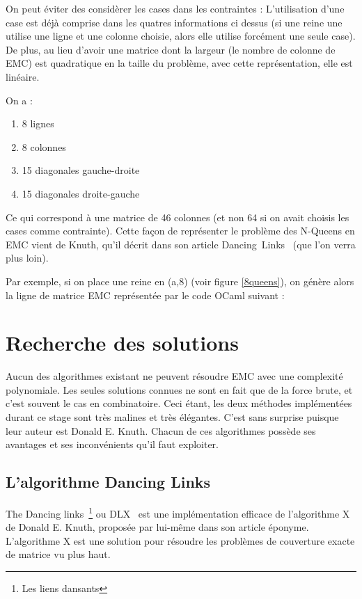 \documentclass[a4paper]{article}
\begin{document}
On peut éviter des considèrer les cases dans les contraintes : L'utilisation
d'une case est déjà comprise dans les quatres informations ci dessus (si une
reine une utilise une ligne et une colonne choisie, alors elle utilise
forcément une seule case).
De plus, au lieu d'avoir une matrice dont la largeur 
(le nombre de colonne de EMC) est
quadratique en la taille du problème, avec cette représentation, elle est
linéaire.

On a : 
\begin{enumerate}
\item 8 lignes
\item 8 colonnes
\item 15 diagonales gauche-droite
\item 15 diagonales droite-gauche
\end{enumerate}

Ce qui correspond à une matrice de 46 colonnes (et non 64 si on avait choisis
les cases comme contrainte).
Cette façon de représenter le problème des N-Queens en EMC vient de Knuth, qu'il
décrit dans son article Dancing~Links~\cite{dlx} (que l'on verra plus loin).

Par exemple, si on place une reine en (a,8) (voir figure \ref{8queens}), on 
génère alors la ligne de matrice EMC représentée par le code OCaml suivant : 




\section{Recherche des solutions}

Aucun des algorithmes existant ne peuvent résoudre EMC
avec une complexité polynomiale. Les seules solutions connues ne sont en fait
que de la force brute, et c'est souvent le cas en combinatoire.
Ceci étant, les deux méthodes implémentées durant ce stage sont 
très malines et très élégantes. C'est sans surprise puisque leur auteur est 
Donald E. Knuth.
Chacun de ces algorithmes possède ses avantages et ses inconvénients qu'il faut 
exploiter.

\subsection{L'algorithme Dancing Links}

The Dancing links~\footnote{Les liens dansants} ou DLX~\cite{dlx} 
est une implémentation efficace de l'algorithme X de Donald 
E. Knuth, proposée par lui-même dans son article éponyme. 
L'algorithme X est une solution pour résoudre 
les problèmes de couverture exacte de matrice vu plus haut.
\end{document}
